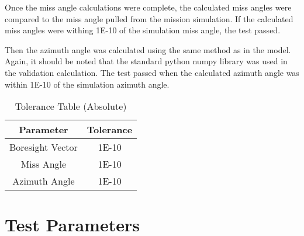 Once the miss angle calculations were complete, the calculated miss angles were compared to the miss angle pulled from the mission simulation. If the calculated miss angles were withing 1E-10 of the simulation miss angle, the test passed.

Then the azimuth angle was calculated using the same method as in the model. Again, it should be noted that the standard python numpy library was used in the validation calculation. The test passed when the calculated azimuth angle was within 1E-10 of the simulation azimuth angle.  

\begin{table}[htbp]
	\caption{Tolerance Table (Absolute)}
	\label{tab:label}
	\centering \fontsize{10}{10}\selectfont
	\begin{tabular}{ c | c } %
		\hline 
		Parameter & Tolerance\\
		\hline 
		Boresight Vector & 1E-10 \\
		Miss Angle & 1E-10 \\
		Azimuth Angle & 1E-10 \\
		\hline
	\end{tabular}
\end{table}

\section{Test Parameters}

